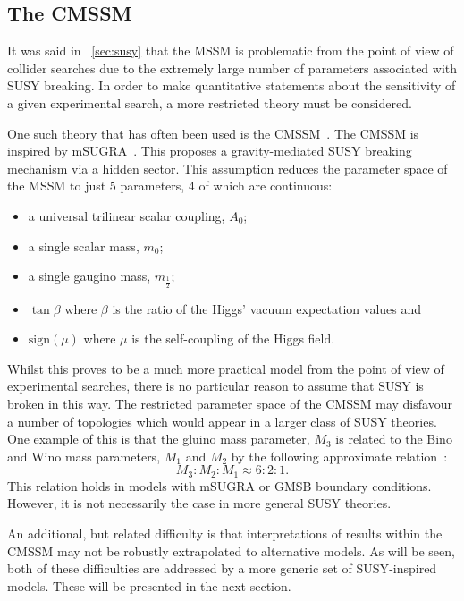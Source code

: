 \subsection{The \acl{CMSSM}}
\label{sec:cmssm}
It was said in \chap~\ref{sec:susy} that the \ac{MSSM} is problematic from the
point of view of collider searches due to the extremely large number of
parameters associated with \ac{SUSY} breaking. In order to make quantitative
statements about the sensitivity of a given experimental search, a more
restricted theory must be considered.

One such theory that has often been used is the
\ac{CMSSM}~\cite{sparticles}. The \ac{CMSSM} is inspired by
\ac{mSUGRA}~\cite{kane_minimal}. This proposes a gravity-mediated \ac{SUSY}
breaking mechanism via a hidden sector. This assumption reduces the parameter
space of the \ac{MSSM} to just 5 parameters, 4 of which are continuous:
\begin{itemize}
\item a universal trilinear scalar coupling, $A_0$;
\item a single scalar mass, $m_0$;
\item a single gaugino mass, $m_{\frac{1}{2}}$;
\item $\tan\beta$ where $\beta$ is the ratio of the Higgs' vacuum expectation values and
\item $\textrm{sign}(\mu)$ where $\mu$ is the self-coupling of the Higgs field.
\end{itemize}

Whilst this proves to be a much more practical model from the point of view of
experimental searches, there is no particular reason to assume that \ac{SUSY} is
broken in this way. The restricted parameter space of the \ac{CMSSM} may
disfavour a number of topologies which would appear in a larger class of
\ac{SUSY} theories. One example of this is that the gluino mass parameter, $M_3$
is related to the Bino and Wino mass parameters, $M_1$ and $M_2$ by the
following approximate relation~\cite[p.99]{susy_primer}:
\begin{equation*}
M_3:M_2:M_1 \approx 6:2:1.
\end{equation*}
This relation holds in models with \ac{mSUGRA} or \ac{GMSB} boundary
conditions. However, it is not necessarily the case in more general \ac{SUSY}
theories.

An additional, but related difficulty is that
interpretations of results within the \ac{CMSSM} may not be robustly
extrapolated to alternative models. As will be seen, both of these difficulties
are addressed by a more generic set of \ac{SUSY}-inspired models. These will be
presented in the next section.

